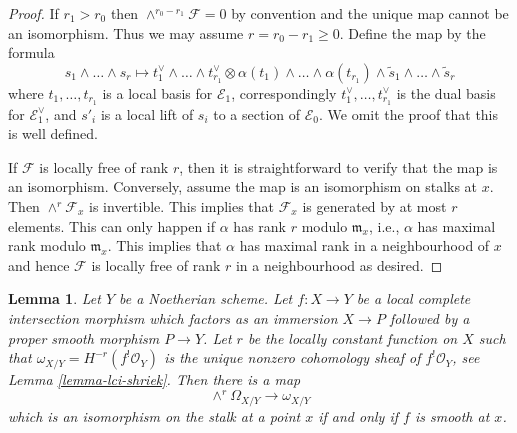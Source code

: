 \documentclass{stacks-project}
\theoremstyle{plain}
\newtheorem{lemma}[subsection]{Lemma}
\theoremstyle{definition}
\theoremstyle{remark}
\numberwithin{equation}{subsection}
\begin{document}
\begin{proof}
If $r_1 > r_0$ then $\wedge^{r_0 - r_1}\mathcal{F} = 0$ by convention
and the unique map cannot be an isomorphism. Thus we may assume
$r = r_0 - r_1 \geq 0$. Define the map by the formula
$$
s_1 \wedge \ldots \wedge s_r \mapsto
t_1^\vee \wedge \ldots \wedge t_{r_1}^\vee \otimes
\alpha(t_1) \wedge \ldots \wedge \alpha(t_{r_1}) \wedge
\tilde s_1 \wedge \ldots \wedge \tilde s_r
$$
where $t_1, \ldots, t_{r_1}$ is a local basis for $\mathcal{E}_1$,
correspondingly
$t_1^\vee, \ldots, t_{r_1}^\vee$ is the dual basis for $\mathcal{E}_1^\vee$,
and $s'_i$ is a local lift of $s_i$ to a section of $\mathcal{E}_0$.
We omit the proof that this is well defined.

\medskip\noindent
If $\mathcal{F}$ is locally free of rank $r$, then it is straightforward
to verify that the map is an isomorphism. Conversely, assume the map
is an isomorphism on stalks at $x$. Then $\wedge^r\mathcal{F}_x$
is invertible. This implies that $\mathcal{F}_x$ is generated by
at most $r$ elements. This can only happen if $\alpha$ has rank
$r$ modulo $\mathfrak m_x$, i.e., $\alpha$ has maximal rank modulo
$\mathfrak m_x$. This implies that $\alpha$ has maximal rank
in a neighbourhood of $x$ and hence $\mathcal{F}$ is locally free
of rank $r$ in a neighbourhood as desired.
\end{proof}

\begin{lemma}
\label{lemma-fundamental-class-lci}
Let $Y$ be a Noetherian scheme. Let $f : X \to Y$ be a
local complete intersection morphism which factors
as an immersion $X \to P$ followed by a proper smooth morphism $P \to Y$.
Let $r$ be the locally constant function on
$X$ such that $\omega_{X/Y} = H^{-r}(f^!\mathcal{O}_Y)$
is the unique nonzero cohomology sheaf of $f^!\mathcal{O}_Y$, see
Lemma \ref{lemma-lci-shriek}.
Then there is a map
$$
\wedge^r\Omega_{X/Y} \longrightarrow \omega_{X/Y}
$$
which is an isomorphism on the stalk at a point $x$ if and only
if $f$ is smooth at $x$.
\end{lemma}
\end{document}
